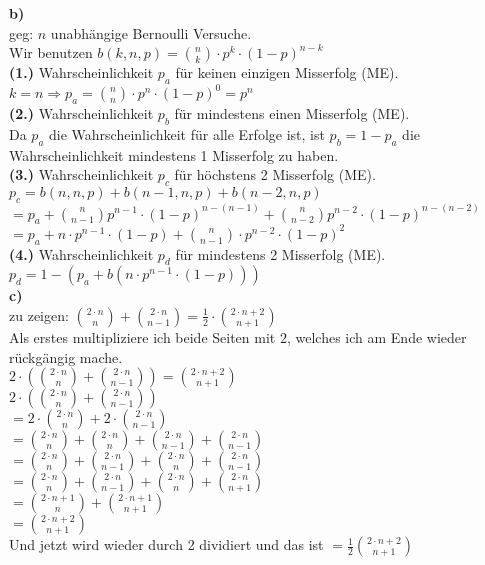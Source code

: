 \documentclass[a4paper]{scrartcl}
\begin{document}
\begin{flushleft}
		\textbf{b)}\\
		geg: $n$ unabhängige Bernoulli Versuche.\\
		Wir benutzen $b(k,n,p)=\binom{n}{k}\cdot p^k\cdot (1-p)^{n-k}$\\[1em]
		\textbf{(1.)} Wahrscheinlichkeit $p_a$ für keinen einzigen Misserfolg (ME).\\[1em]
		$k=n \Rightarrow p_a=\binom{n}{n}\cdot p^n\cdot (1-p)^0=p^n$\\[1em]
		\textbf{(2.)} Wahrscheinlichkeit $p_b$ für mindestens einen Misserfolg (ME).\\[1em]
		Da $p_a$ die Wahrscheinlichkeit für alle Erfolge ist, ist $p_b=1-p_a$ die Wahrscheinlichkeit mindestens 1 Misserfolg zu haben.\\[1em]		
		\textbf{(3.)} Wahrscheinlichkeit $p_c$ für höchstens 2 Misserfolg (ME).\\[1em]
		$p_c=b(n,n,p)+b(n-1,n,p)+b(n-2,n,p)$\\
		$= p_a+\binom{n}{n-1}p^{n-1}\cdot (1-p)^{n-(n-1)}+\binom{n}{n-2}p^{n-2}\cdot (1-p)^{n-(n-2)}$\\
		$=p_a+n\cdot p^{n-1}\cdot (1-p)+\binom{n}{n-1}\cdot p^{n-2}\cdot (1-p)^2$\\
		\textbf{(4.)} Wahrscheinlichkeit $p_d$ für mindestens 2 Misserfolg (ME).\\[1em]
		$p_d=1-(p_a+b(n\cdot p^{n-1}\cdot (1-p)))$\\[1em]

		\textbf{c)}\\
		zu zeigen: $\binom{2\cdot n}{n} + \binom{2\cdot n}{n - 1} = \frac{1}{2}\cdot\binom{2\cdot n + 2}{n + 1}$\\[1em]
		Als erstes multipliziere ich beide Seiten mit $2$, welches ich am Ende wieder rückgängig mache.\\
		$2\cdot(\binom{2\cdot n}{n} + \binom{2\cdot n}{n - 1}) = \binom{2\cdot n + 2}{n + 1}$\\[1em]
		$2\cdot(\binom{2\cdot n}{n} + \binom{2\cdot n}{n - 1})$\\
		$= 2\cdot\binom{2\cdot n}{n} + 2\cdot\binom{2\cdot n}{n - 1}$\\
		$= \binom{2\cdot n}{n} + \binom{2\cdot n}{n} + \binom{2\cdot n}{n - 1} + \binom{2\cdot n}{n - 1}$\\
		$= \binom{2\cdot n}{n} + \binom{2\cdot n}{n - 1} + \binom{2\cdot n}{n} + \binom{2\cdot n}{n - 1}$\\
		$= \binom{2\cdot n}{n} + \binom{2\cdot n}{n - 1} + \binom{2\cdot n}{n} + \binom{2\cdot n}{n + 1}$\\
		$= \binom{2\cdot n + 1}{n} + \binom{2\cdot n + 1}{n + 1}$\\
		$= \binom{2\cdot n + 2}{n + 1}$\\[1em]
		Und jetzt wird wieder durch 2 dividiert und das ist $= \frac{1}{2}\binom{2\cdot n + 2}{n + 1}$\\[1em]


\end{flushleft}
\end{document}
